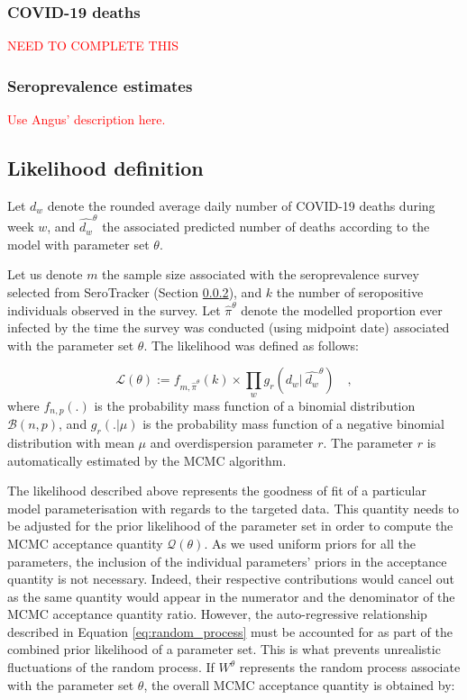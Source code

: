 \subsubsection{COVID-19 deaths}
\textcolor{red}{NEED TO COMPLETE THIS}

\subsubsection{Seroprevalence estimates}
\label{sero}
\textcolor{red}{Use Angus' description here.}

\subsection{Likelihood definition}
\label{likelihood}
Let $d_w$ denote the rounded average daily number of COVID-19 deaths during week $w$, and $\hat{d_w}^\theta$ 
the associated predicted number of deaths according to the model with parameter set $\theta$. 

Let us denote $m$ the sample size associated with the seroprevalence survey selected from SeroTracker (Section \ref{sero}), 
and $k$ the number of seropositive individuals observed in the survey.
Let $\hat{\pi}^\theta$ denote the modelled proportion ever infected by the time the survey was conducted (using midpoint date) 
associated with the parameter set $\theta$. 
The likelihood was defined as follows:

\begin{equation}
    \label{eq:likelihood}
    \mathcal{L}(\theta) := f_{m,\hat{\pi}^\theta}(k) \times \prod_w g_r(d_w | \:\hat{d_w}^\theta) \quad ,
\end{equation}
where $f_{n,p}(.)$ is the probability mass function of a binomial distribution $\mathcal{B}(n,p)$, and 
$g_r(. | \mu)$ is the probability mass function of a negative binomial distribution with mean $\mu$ and 
overdispersion parameter $r$. The parameter $r$ is automatically estimated by the MCMC algorithm.

The likelihood described above represents the goodness of fit of a particular model parameterisation with regards to the targeted data. 
This quantity needs to be adjusted for the prior likelihood of the parameter set in order to compute the MCMC acceptance quantity $\mathcal{Q}(\theta)$.
As we used uniform priors for all the parameters, the inclusion of the individual parameters' priors in the acceptance quantity is not necessary. 
Indeed, their respective contributions would cancel out as the same quantity would appear in the numerator and the denominator of the 
MCMC acceptance quantity ratio. However, the auto-regressive relationship described in Equation \ref{eq:random_process}
must be accounted for as part of the combined prior likelihood of a parameter set. This is what prevents unrealistic fluctuations of the random process.
If $W^\theta$ represents the random process associate with the parameter set $\theta$, the overall MCMC acceptance quantity is obtained by:

